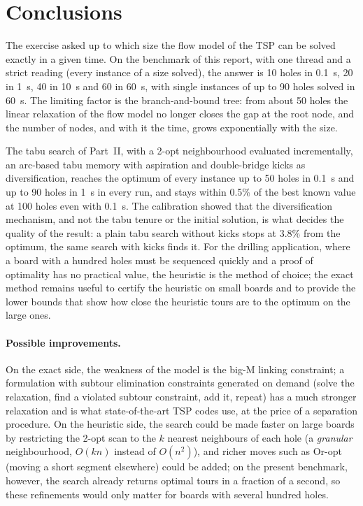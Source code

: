 \documentclass[11pt,a4paper]{article}
\begin{document}
\section{Conclusions}\label{sec:concl}
The exercise asked up to which size the flow model of the TSP can be solved exactly in a
given time. On the benchmark of this report, with one thread and a strict reading (every
instance of a size solved), the answer is 10 holes in 0.1~s, 20 in 1~s, 40 in 10~s and 60 in
60~s, with single instances of up to 90 holes solved in 60~s. The limiting factor is the
branch-and-bound tree: from about 50 holes the linear relaxation of the flow model no longer
closes the gap at the root node, and the number of nodes, and with it the time, grows
exponentially with the size.

The tabu search of Part~II, with a 2-opt neighbourhood evaluated incrementally, an arc-based
tabu memory with aspiration and double-bridge kicks as diversification, reaches the optimum
of every instance up to 50 holes in 0.1~s and up to 90 holes in 1~s in every run, and stays
within 0.5\% of the best known value at 100 holes even with 0.1~s. The calibration showed
that the diversification mechanism, and not the tabu tenure or the initial solution, is
what decides the quality of the result: a plain tabu search without kicks stops at 3.8\% from
the optimum, the same search with kicks finds it. For the drilling application, where a board
with a hundred holes must be sequenced quickly and a proof of optimality has no practical
value, the heuristic is the method of choice; the exact method remains useful to certify the
heuristic on small boards and to provide the lower bounds that show how close the heuristic
tours are to the optimum on the large ones.

\paragraph{Possible improvements.}
On the exact side, the weakness of the model is the big-M linking constraint; a formulation
with subtour elimination constraints generated on demand (solve the relaxation, find a
violated subtour constraint, add it, repeat) has a much stronger relaxation and is what
state-of-the-art TSP codes use, at the price of a separation procedure. On the heuristic side,
the search could be made faster on large boards by restricting the 2-opt scan to the $k$
nearest neighbours of each hole (a \emph{granular} neighbourhood, $O(kn)$ instead of $O(n^2)$),
and richer moves such as Or-opt (moving a short segment elsewhere) could be added; on the
present benchmark, however, the search already returns optimal tours in a fraction of a
second, so these refinements would only matter for boards with several hundred holes.
\end{document}
